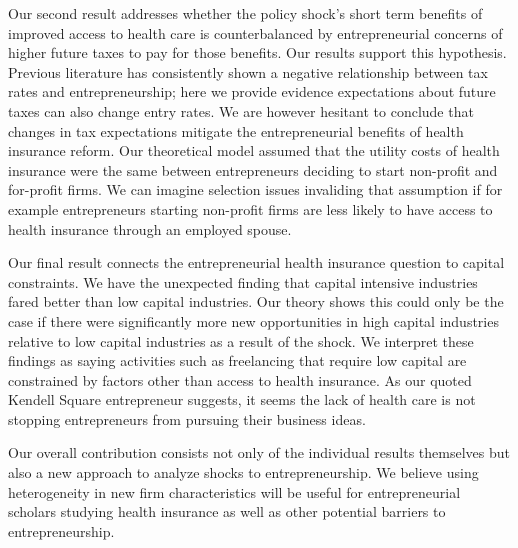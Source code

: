 Our second result addresses whether the policy shock's short term benefits of improved access to health care is counterbalanced by entrepreneurial concerns of higher future taxes to pay for those benefits. Our results support this hypothesis. Previous literature  has consistently shown a negative relationship between tax rates and entrepreneurship; here we provide evidence expectations about future taxes can also change entry rates. We are however hesitant to conclude that changes in tax expectations mitigate the entrepreneurial benefits of health insurance reform. Our theoretical model assumed that the utility costs of health insurance were the same between entrepreneurs deciding to start non-profit and for-profit firms. We can imagine selection issues invaliding that assumption if for example entrepreneurs starting non-profit firms are less likely to have access to health insurance through an employed spouse. 

Our final result connects the entrepreneurial health insurance question to capital constraints. We have the unexpected finding that capital intensive industries fared better than low capital industries. Our theory shows this could only be the case if there were significantly more new opportunities in high capital industries relative to low capital industries as a result of the shock. We interpret these findings as saying activities such as freelancing that require low capital are constrained by factors other than access to health insurance. As our quoted Kendell Square entrepreneur suggests, it seems the lack of health care is not stopping entrepreneurs from pursuing their business ideas. 

Our overall contribution consists not only of the individual results themselves but also a new approach to analyze shocks to entrepreneurship. We believe using heterogeneity in new firm characteristics will be useful for entrepreneurial scholars studying health insurance as well as other potential barriers to entrepreneurship. 

\newpage


